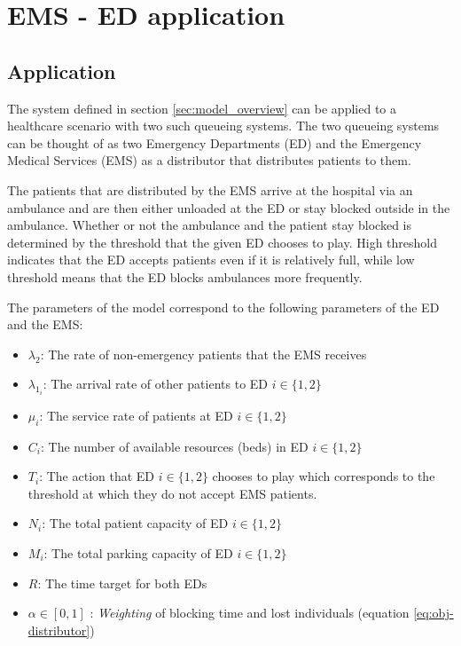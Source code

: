 \section{EMS - ED application}

\subsection{Application}

The system defined in section \ref{sec:model_overview} can be applied 
to a healthcare scenario with two such queueing systems.
The two queueing systems can be thought of as two Emergency Departments (ED) and 
the Emergency Medical Services (EMS) as a distributor that distributes 
patients to them.

The patients that are distributed by the EMS arrive at the hospital via an 
ambulance and are then either unloaded at the ED or stay blocked outside in 
the ambulance.
Whether or not the ambulance and the patient stay blocked is determined by 
the threshold that the given ED chooses to play.
High threshold indicates that the ED accepts patients even if it is relatively 
full, while low threshold means that the ED blocks ambulances more frequently.

The parameters of the model correspond to the following parameters of the ED and 
the EMS:

\begin{itemize}
    \item \( \lambda_2 \): The rate of non-emergency patients that the EMS 
    receives
    \item \( \lambda_{1_i} \): The arrival rate of other patients to ED \(i\in\{1, 2\}\)
    \item \( \mu_i \): The service rate of patients at ED \(i\in\{1, 2\}\)
    \item \( C_i \): The number of available resources (beds) in ED \(i\in\{1, 2\}\)  
    \item \( T_i \): The action that ED \(i\in\{1, 2\} \) chooses to play which 
    corresponds to the threshold at which they do not accept EMS patients.
    \item \( N_i \): The total patient capacity of ED \(i\in\{1, 2\} \)
    \item \( M_i \): The total parking capacity of ED \(i\in\{1, 2\} \)
    \item \( R \): The time target for both EDs
    \item \( \alpha \in [0, 1] \) : \textit{Weighting} of blocking time and 
    lost individuals (equation \ref{eq:obj-distributor})
\end{itemize}


